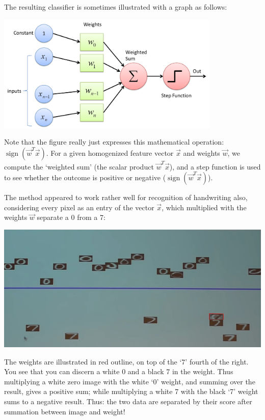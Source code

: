 \documentclass{article}
\DeclareMathOperator{\sign}{sign}
\begin{document}
\begin{spexample}
    The resulting classifier is sometimes illustrated with a graph as follows:
    \begin{center}\includegraphics[width=0.8\textwidth]{perceptrongraph.png}\end{center}
    Note that the figure really just expresses this mathematical operation: $\sign(\vec{w}^T\vec{x})$. For a given homogenized feature vector $\vec{x}$ and weights $\vec{w}$, we compute the `weighted sum' (the scalar product $\vec{w}^T\vec{x}$), and a step function is used to see whether the outcome is positive or negative ($\sign(\vec{w}^T\vec{x})$).
\end{spexample}
\begin{testexample}
    The method appeared to work rather well for recognition of handwriting also, considering every pixel as an entry of the vector $\vec{x}$, which multiplied with the weights $\vec{w}$ separate a 0 from a 7:
    \begin{center}\includegraphics[width=1\textwidth]{numberrecog.png}\end{center}
    The weights are illustrated in red outline, on top of the `7' fourth of the right. You see that you can discern a white 0 and a black 7 in the weight. Thus multiplying a white zero image with the white `0' weight, and summing over the result, gives a positive sum; while multiplying a white 7 with the black `7' weight sums to a negative result. Thus: the two data are separated by their score after summation between image and weight!
\end{testexample}\vspace{-0.5cm}
\end{document}
